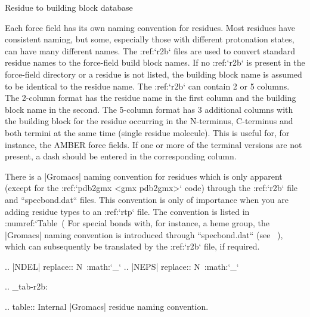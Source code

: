Residue to building block database
~~~~~~~~~~~~~~~~~~~~~~~~~~~~~~~~~~

Each force field has its own naming convention for residues. Most
residues have consistent naming, but some, especially those with
different protonation states, can have many different names. The
:ref:`r2b` files are used to convert standard residue names to
the force-field build block names. If no :ref:`r2b` is present
in the force-field directory or a residue is not listed, the building
block name is assumed to be identical to the residue name. The
:ref:`r2b` can contain 2 or 5 columns. The 2-column format has
the residue name in the first column and the building block name in the
second. The 5-column format has 3 additional columns with the building
block for the residue occurring in the N-terminus, C-terminus and both
termini at the same time (single residue molecule). This is useful for,
for instance, the AMBER force fields. If one or more of the terminal
versions are not present, a dash should be entered in the corresponding
column.

There is a |Gromacs| naming convention for residues which is only apparent
(except for the :ref:`pdb2gmx <gmx pdb2gmx>` code) through the
:ref:`r2b` file and ``specbond.dat`` files. This
convention is only of importance when you are adding residue types to an
:ref:`rtp` file. The convention is listed in :numref:`Table (%
For special bonds with, for instance,
a heme group, the |Gromacs| naming convention is introduced through
``specbond.dat`` (see 
),
which can subsequently be translated by the :ref:`r2b` file,
if required.

.. |NDEL| replace:: N\ :math:`_\delta`
.. |NEPS| replace:: N\ :math:`_\epsilon`

.. _tab-r2b:

.. table:: Internal |Gromacs| residue naming convention.

